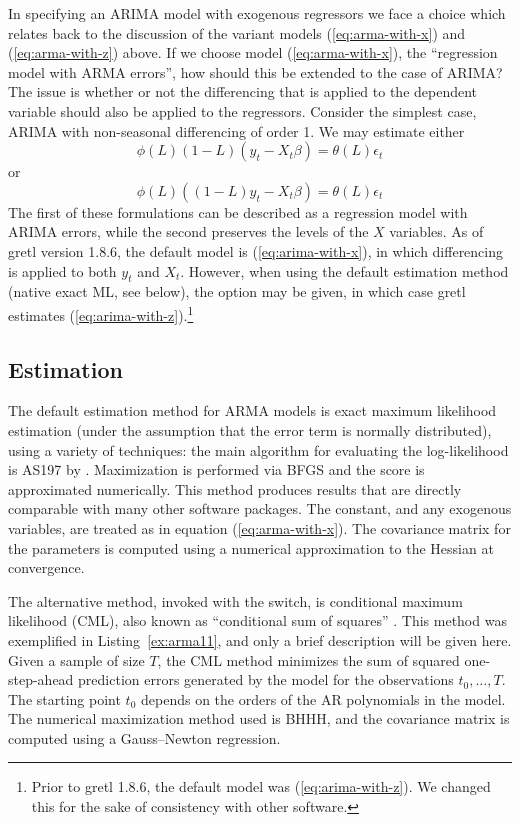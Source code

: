 In specifying an ARIMA model with exogenous regressors we face a
choice which relates back to the discussion of the variant models
(\ref{eq:arma-with-x}) and (\ref{eq:arma-with-z}) above.  If we choose
model (\ref{eq:arma-with-x}), the ``regression model with ARMA
errors'', how should this be extended to the case of ARIMA?  The issue
is whether or not the differencing that is applied to the dependent
variable should also be applied to the regressors.  Consider the
simplest case, ARIMA with non-seasonal differencing of order 1. We may
estimate either
\begin{equation}
  \label{eq:arima-with-x}
  \phi(L) (1-L) (y_t - X_t\beta) = \theta(L) \epsilon_t
\end{equation}
or
\begin{equation}
  \label{eq:arima-with-z}
  \phi(L) \left((1-L) y_t - X_t\beta\right) = \theta(L) \epsilon_t
\end{equation}
%
The first of these formulations can be described as a regression model
with ARIMA errors, while the second preserves the levels of the $X$
variables.  As of gretl version 1.8.6, the default model is
(\ref{eq:arima-with-x}), in which differencing is applied to both
$y_t$ and $X_t$.  However, when using the default estimation method
(native exact ML, see below), the option  may be
given, in which case gretl estimates
(\ref{eq:arima-with-z}).\footnote{Prior to gretl 1.8.6, the
  default model was (\ref{eq:arima-with-z}).  We changed this for the
  sake of consistency with other software.}

\subsection{Estimation}
\label{arma-est}

The default estimation method for ARMA models is exact maximum
likelihood estimation (under the assumption that the error term is
normally distributed), using a variety of techniques: the main
algorithm for evaluating the log-likelihood is AS197 by
\cite{melard84}. Maximization is performed via BFGS and the score is
approximated numerically.  This method produces results that are
directly comparable with many other software packages.  The constant,
and any exogenous variables, are treated as in equation
(\ref{eq:arma-with-x}).  The covariance matrix for the parameters is
computed using a numerical approximation to the Hessian at
convergence.

The alternative method, invoked with the  switch,
is conditional maximum likelihood (CML), also known as ``conditional
sum of squares'' \citep[see][p.\ 132]{hamilton94}.  This method was
exemplified in Listing~\ref{ex:arma11}, and only a brief
description will be given here.  Given a sample of size $T$, the CML
method minimizes the sum of squared one-step-ahead prediction errors
generated by the model for the observations $t_0, \ldots, T$.  The
starting point $t_0$ depends on the orders of the AR polynomials in
the model.  The numerical maximization method used is BHHH, and the
covariance matrix is computed using a Gauss--Newton regression.


